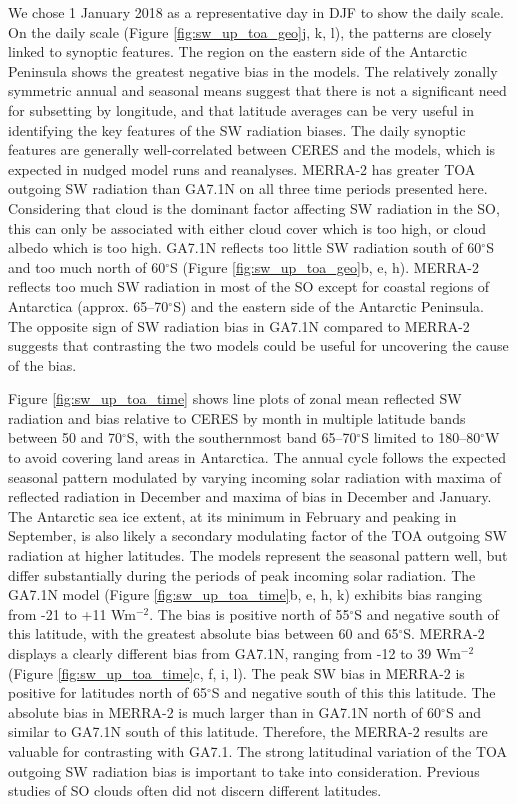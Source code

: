 We chose 1 January 2018 as a representative day in DJF to show the daily scale.
On the daily scale (Figure \ref{fig:sw_up_toa_geo}j, k, l), the patterns are
closely linked to synoptic features. The region on the eastern side of the
Antarctic Peninsula shows the greatest negative bias in the models. The
relatively zonally symmetric annual and seasonal means suggest that there is
not a significant need for subsetting by longitude, and that latitude averages
can be very useful in identifying the key features of the SW radiation biases.
The daily synoptic features are generally well-correlated between CERES and the
models, which is expected in nudged model runs and reanalyses. MERRA-2 has
greater TOA outgoing SW radiation than GA7.1N on all three time periods
presented here. Considering that cloud is the dominant factor affecting SW
radiation in the SO, this can only be associated with either cloud cover which
is too high, or cloud albedo which is too high. GA7.1N reflects too little SW
radiation south of 60$^\circ$S and too much north of 60$^\circ$S (Figure
\ref{fig:sw_up_toa_geo}b, e, h). MERRA-2 reflects too much SW radiation in most
of the SO except for coastal regions of Antarctica (approx. 65--70$^\circ$S)
and the eastern side of the Antarctic Peninsula. The opposite sign of SW
radiation bias in GA7.1N compared to MERRA-2 suggests that contrasting the two
models could be useful for uncovering the cause of the bias.

Figure \ref{fig:sw_up_toa_time} shows line plots of zonal mean reflected SW
radiation and bias relative to CERES by month in multiple latitude bands
between 50 and 70$^\circ$S, with the southernmost band 65--70$^\circ$S limited
to 180--80$^\circ$W to avoid covering land areas in Antarctica. The annual
cycle follows the expected seasonal pattern modulated by varying incoming solar
radiation with maxima of reflected radiation in December and maxima of bias in
December and January. The Antarctic sea ice extent, at its minimum in February
and peaking in September, is also likely a secondary modulating factor of the
TOA outgoing SW radiation at higher latitudes. The models represent the
seasonal pattern well, but differ substantially during the periods of peak
incoming solar radiation. The GA7.1N model (Figure \ref{fig:sw_up_toa_time}b, e,
h, k) exhibits bias ranging from -21 to +11 Wm$^{-2}$. The bias is positive
north of 55$^\circ$S and negative south of this latitude, with the greatest
absolute bias between 60 and 65$^\circ$S. MERRA-2 displays a clearly different
bias from GA7.1N, ranging from -12 to 39 Wm$^{-2}$ (Figure
\ref{fig:sw_up_toa_time}c, f, i, l). The peak SW bias in MERRA-2 is positive for
latitudes north of 65$^\circ$S and negative south of this this latitude. The
absolute bias in MERRA-2 is much larger than in GA7.1N north of 60$^\circ$S and
similar to GA7.1N south of this latitude. Therefore, the MERRA-2 results are
valuable for contrasting with GA7.1. The strong latitudinal variation of the
TOA outgoing SW radiation bias is important to take into consideration.
Previous studies of SO clouds often did not discern different latitudes.

